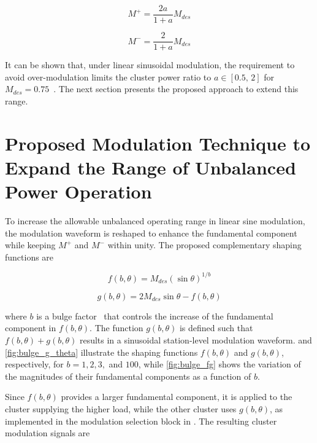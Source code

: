 \documentclass[conference]{IEEEtran}
\begin{document}
\begin{equation}
M^+ = \frac{2a}{1+a} M_{des}
\label{eq:pos_mod}
\end{equation}

\begin{equation}
M^- = \frac{2}{1+a} M_{des}
\label{eq:neg_mod}
\end{equation}

It can be shown that, under linear sinusoidal modulation, the requirement to avoid over-modulation limits the cluster power ratio to \(a \in [0.5,\,2]\) for \(M_{des}=0.75\)~\cite{Ko_clamped_pwm}. The next section presents the proposed approach to extend this range.

\section{Proposed Modulation Technique to Expand the Range of Unbalanced Power Operation}

To increase the allowable unbalanced operating range in linear sine modulation, the modulation waveform is reshaped to enhance the fundamental component while keeping $M^+$ and $M^-$ within unity. The proposed complementary shaping functions are

\begin{equation}
f(b,\theta) = M_{des}(\sin\theta)^{1/b}
\label{eq:f_eq}
\end{equation}

\begin{equation}
g(b,\theta) = 2M_{des}\sin\theta - f(b,\theta)
\label{eq:g_eq}
\end{equation}

where $b$ is a bulge factor~\cite{Mouli_bulge_factor} that controls the increase of the fundamental component in $f(b,\theta)$. The function $g(b,\theta)$ is defined such that $f(b,\theta)+g(b,\theta)$ results in a sinusoidal station-level modulation waveform.  and \cref{fig:bulge_g_theta} illustrate the shaping functions $f(b,\theta)$ and $g(b,\theta)$, respectively, for $b=1,2,3,$ and $100$, while \cref{fig:bulge_fg} shows the variation of the magnitudes of their fundamental components as a function of $b$.

Since $f(b,\theta)$ provides a larger fundamental component, it is applied to the cluster supplying the higher load, while the other cluster uses $g(b,\theta)$, as implemented in the modulation selection block in . The resulting cluster modulation signals are
\end{document}
